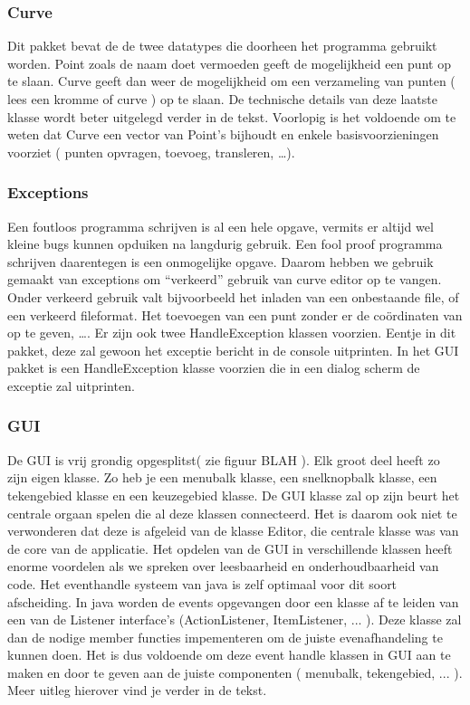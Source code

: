 \documentclass[a4paper,11pt,oneside, titlepage]{article}
\begin{document}
\subsubsection{Curve}
Dit pakket bevat de de twee datatypes die doorheen het programma gebruikt worden. Point zoals
de naam doet vermoeden geeft de mogelijkheid een punt op te slaan. Curve geeft dan weer de
mogelijkheid om een verzameling van punten ( lees een kromme of curve ) op te slaan. De
technische details van deze laatste klasse wordt beter uitgelegd verder in de tekst. 
Voorlopig is het voldoende om te weten dat Curve een vector van Point's bijhoudt en enkele
basisvoorzieningen voorziet ( punten opvragen, toevoeg, transleren, \ldots ).
\subsubsection{Exceptions}
Een foutloos programma schrijven is al een hele opgave, vermits er altijd wel kleine bugs
kunnen opduiken na langdurig gebruik. Een fool proof programma schrijven daarentegen is een
onmogelijke opgave. Daarom hebben we gebruik gemaakt van exceptions om ``verkeerd'' gebruik van
curve editor op te vangen. Onder verkeerd gebruik valt bijvoorbeeld het inladen van een
onbestaande file, of een verkeerd fileformat. Het toevoegen van een punt zonder er de 
co\"ordinaten van op te geven, \ldots.\newline \newline
Er zijn ook twee HandleException klassen voorzien. Eentje in dit pakket, deze zal gewoon 
het exceptie bericht in de console uitprinten. In het GUI pakket is een HandleException klasse
voorzien die in een dialog scherm de exceptie zal uitprinten.
\subsubsection{GUI}
De GUI is vrij grondig opgesplitst( zie figuur BLAH ). Elk groot deel heeft zo zijn eigen klasse.
Zo heb je een menubalk klasse, een snelknopbalk klasse, een tekengebied klasse en een keuzegebied
klasse. \newline
De GUI klasse zal op zijn beurt het centrale orgaan spelen die al deze klassen 
connecteerd. Het is daarom ook niet te verwonderen dat deze is afgeleid van de klasse Editor,
die centrale klasse was van de core van de applicatie. 
\newline
Het opdelen van de GUI in verschillende klassen heeft enorme voordelen als we spreken 
over leesbaarheid en onderhoudbaarheid van code. Het eventhandle systeem van java is zelf
optimaal voor dit soort afscheiding. In java worden de events opgevangen door een klasse 
af te leiden van een van de Listener interface's (ActionListener, ItemListener, ... ). Deze 
klasse zal dan de nodige member functies impementeren om de juiste evenafhandeling te kunnen
doen. Het is dus voldoende om deze event handle klassen in GUI aan te maken en door te geven
aan de juiste componenten ( menubalk, tekengebied, ... ). Meer uitleg hierover vind je verder in
de tekst.
\end{document}
